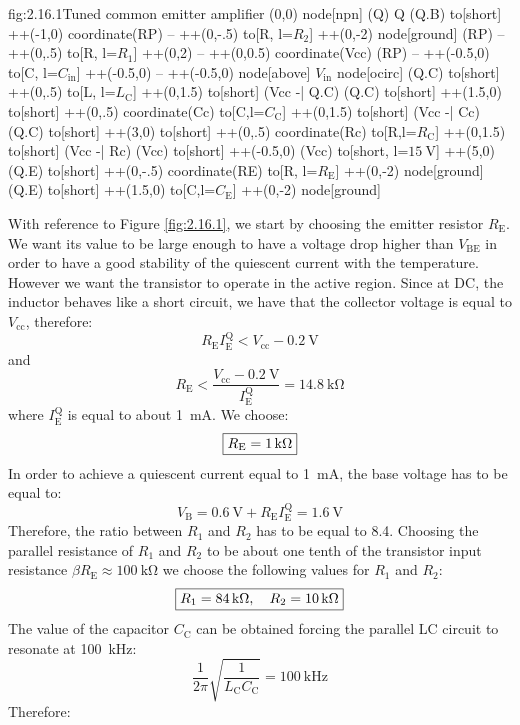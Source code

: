 \begin{circuit}{fig:2.16.1}{Tuned common emitter amplifier}
    (0,0) node[npn] (Q) {Q}
    (Q.B) to[short] ++(-1,0) coordinate(RP)
    -- ++(0,-.5) 
    to[R, l=$R_2$] ++(0,-2)
    node[ground] {}
    (RP) -- ++(0,.5)
    to[R, l=$R_1$] ++(0,2)
    -- ++(0,0.5) coordinate(Vcc)
    (RP) -- ++(-0.5,0)
    to[C, l=$C_\text{in}$] ++(-0.5,0)
    -- ++(-0.5,0)
    node[above] {$V_\text{in}$}
    node[ocirc] {}
    (Q.C) to[short] ++(0,.5)
    to[L, l=$L_\text{C}$] ++(0,1.5)
    to[short] (Vcc -| Q.C)
    (Q.C) to[short] ++(1.5,0)
    to[short] ++(0,.5) coordinate(Cc)
    to[C,l=$C_\text{C}$] ++(0,1.5)
    to[short] (Vcc -| Cc)
    (Q.C) to[short] ++(3,0)
    to[short] ++(0,.5) coordinate(Rc)
    to[R,l=$R_\text{C}$] ++(0,1.5)
    to[short] (Vcc -| Rc)
    (Vcc) to[short] ++(-0.5,0)
    (Vcc) to[short, l=$\SI{15}{\volt}$] ++(5,0)
    (Q.E) to[short] ++(0,-.5) coordinate(RE)
    to[R, l=$R_\text{E}$] ++(0,-2)
    node[ground] {}
    (Q.E) to[short] ++(1.5,0)
    to[C,l=$C_\text{E}$] ++(0,-2)
    node[ground] {}
\end{circuit}
With reference to Figure \ref{fig:2.16.1}, we start by choosing the emitter resistor $R_\text{E}$. We want its value to be large enough to have a voltage drop higher than $V_\text{BE}$ in order to have a good stability of the quiescent current with the temperature. However we want the transistor to operate in the active region. Since at DC, the inductor behaves like a short circuit, we have that the collector voltage is equal to $V_\text{cc}$, therefore:
\[R_\text{E}I_\text{E}^\text{Q}<V_\text{cc}-\SI{0.2}{\volt}\]
and
\[R_\text{E}<\frac{V_\text{cc}-\SI{0.2}{\volt}}{I_\text{E}^\text{Q}}=\SI{14.8}{\kilo\ohm}\]
where $I_\text{E}^\text{Q}$ is equal to about \SI{1}{\milli\ampere}.
We choose:
\[\boxed{R_\text{E}=\SI{1}{\kilo\ohm}}\]
In order to achieve a quiescent current equal to \SI{1}{\milli\ampere}, the base voltage has to be equal to:
\[V_\text{B}=\SI{0.6}{\volt}+R_\text{E}I_\text{E}^\text{Q}=\SI{1.6}{\volt}\]
Therefore, the ratio between $R_1$ and $R_2$ has to be equal to \num{8.4}. Choosing the parallel resistance of $R_1$ and $R_2$ to be about one tenth of the transistor input resistance $\beta R_\text{E}\approx\SI{100}{\kilo\ohm}$ we choose the following values for $R_1$ and $R_2$:
\[\boxed{R_1=\SI{84}{\kilo\ohm},\quad R_2=\SI{10}{\kilo\ohm}}\]
The value of the capacitor $C_\text{C}$ can be obtained forcing the parallel LC circuit to resonate at \SI{100}{\kilo\hertz}:
\[\frac{1}{2\pi}\sqrt{\frac{1}{L_\text{C}C_\text{C}}}=\SI{100}{\kilo\hertz}\]
Therefore:
